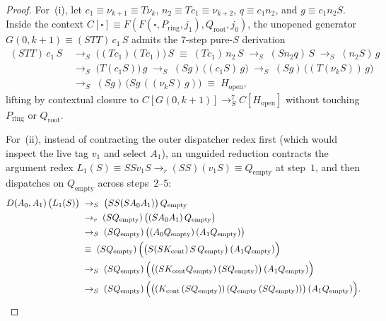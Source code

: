 \documentclass[11pt,reqno]{amsart}
\numberwithin{equation}{section}
\theoremstyle{plain}
\theoremstyle{definition}
\theoremstyle{remark}
\newcommand{\redS}{\to_S}
\begin{document}
\begin{proof}
For~(i), let $c_1 \equiv \nu_{k+1} \equiv T \nu_k$, $n_2 \equiv T c_1 \equiv \nu_{k+2}$, $q \equiv c_1 n_2$, and $g \equiv c_1 n_2 S$. Inside the context $C[\square] \equiv F(F(\square, P_{\mathrm{ring}}, j_1), Q_{\mathrm{root}}, j_0)$, the unopened generator $G(0, k+1) \equiv (S T T)\,c_1\,S$ admits the $7$-step pure-$S$ derivation
\begin{align*}
  (S T T)\,c_1\,S
  &\;\redS\; \bigl((T c_1)(T c_1)\bigr)\,S \;\equiv\; (T c_1)\,n_2\,S
   \;\redS\; (S n_2 q)\,S
   \;\redS\; (n_2 S)\,g \\
  &\;\redS\; \bigl(T(c_1 S)\bigr)\,g
   \;\redS\; (S g)\,\bigl((c_1 S)\,g\bigr)
   \;\redS\; (S g)\,\bigl((T(\nu_k S))\,g\bigr) \\
  &\;\redS\; (S g)\,\bigl(S g\,((\nu_k S)\,g)\bigr) \;\equiv\; H_{\mathrm{open}},
\end{align*}
lifting by contextual closure to $C[G(0,k+1)] \redS^7 C[H_{\mathrm{open}}]$ without touching $P_{\mathrm{ring}}$ or $Q_{\mathrm{root}}$.

For~(ii), instead of contracting the outer dispatcher redex first (which would inspect the live tag $v_1$ and select $A_1$), an unguided reduction contracts the argument redex $L_1(S) \equiv S S v_1 S \to_r (S S)(v_1 S) \equiv Q_{\mathrm{empty}}$ at step~$1$, and then dispatches on $Q_{\mathrm{empty}}$ across steps~$2$--$5$:
\begin{align*}
  D(A_0, A_1)\,\bigl(L_1(S)\bigr)
  &\;\redS\; \bigl(S S (S A_0 A_1)\bigr)\,Q_{\mathrm{empty}} \\
  &\;\to_r\; (S Q_{\mathrm{empty}})\,\bigl((S A_0 A_1)\,Q_{\mathrm{empty}}\bigr) \\
  &\;\redS\; (S Q_{\mathrm{empty}})\,\bigl((A_0 Q_{\mathrm{empty}})\,(A_1 Q_{\mathrm{empty}})\bigr) \\
  &\;\equiv\; (S Q_{\mathrm{empty}})\,\Bigl(\bigl(S(S K_{\mathrm{cont}})\,S\,Q_{\mathrm{empty}}\bigr)\,(A_1 Q_{\mathrm{empty}})\Bigr) \\
  &\;\redS\; (S Q_{\mathrm{empty}})\,\Bigl(\bigl((S K_{\mathrm{cont}} Q_{\mathrm{empty}})\,(S Q_{\mathrm{empty}})\bigr)\,(A_1 Q_{\mathrm{empty}})\Bigr) \\
  &\;\redS\; (S Q_{\mathrm{empty}})\,\Bigl(\bigl((K_{\mathrm{cont}}\,(S Q_{\mathrm{empty}}))\,(Q_{\mathrm{empty}}\,(S Q_{\mathrm{empty}}))\bigr)\,(A_1 Q_{\mathrm{empty}})\Bigr). \qedhere
\end{align*}
\end{proof}
\end{document}
